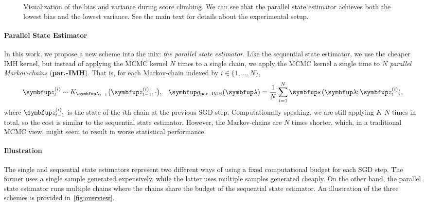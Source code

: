 \begin{figure}
    \vspace{-0.3in}
    \centering
    
    \vspace{-0.3in}
    \caption{Visualization of the bias and variance during score climbing.
      We can see that the parallel state estimator achieves both the lowest bias and the lowest variance.
      See the main text for details about the experimental setup.
    }\label{fig:gaussian}
    \vspace{-0.15in}
\end{figure}

\vspace{-0.08in}
\paragraph{Parallel State Estimator}
In this work, we propose a new scheme into the mix: \textit{the parallel state estimator}.
Like the sequential state estimator, we use the cheaper IMH kernel, but instead of applying the MCMC kernel \(N\) times to a single chain, we apply the MCMC kernel a single time to \(N\) \textit{parallel Markov-chains} (\textbf{par.-IMH}).
That is, for each Markov-chain indexed by \(i \in \{1, \ldots, N\}\),
%
\vspace{-0.05in}
\begin{align*}
  &\vz_{t}^{(i)} \sim K_{\vlambda_{t-1}}\big(\vz_{t-1}^{(i)}, \cdot \big),
  &\vg_{\text{par.-IMH}}(\vlambda) = \frac{1}{N} \sum_{i=1}^N \vs\,(\vlambda; \vz_{t}^{(i)}),
\end{align*}
%
where \(\vz_{t-1}^{(i)}\) is the state of the \(i\)th chain at the previous SGD step.
Computationally speaking, we are still applying \(K\) \(N\) times in total, so the cost is similar to the sequential state estimator.
However, the Markov-chains are \(N\) times shorter, which, in a traditional MCMC view, might seem to result in worse statistical performance.

\vspace{-0.08in}
\paragraph{Illustration}
The single and sequential state estimators represent two different ways of using a fixed computational budget for each SGD step.
The former uses a single sample generated expensively, while the latter uses multiple samples generated cheaply.
On the other hand, the parallel state estimator runs multiple chains where the chains share the budget of the sequential state estimator.
An illustration of the three schemes is provided in~\cref{fig:overview}.

